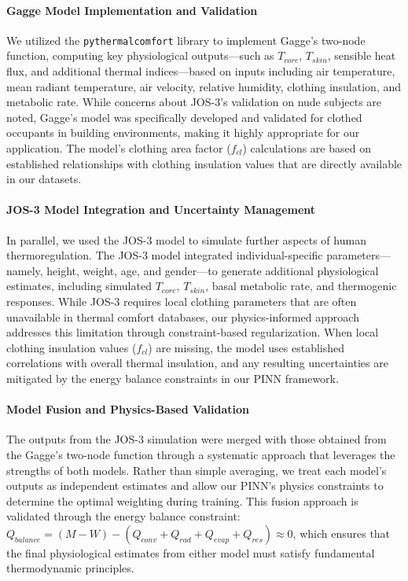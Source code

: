 \paragraph{Gagge Model Implementation and Validation} We utilized the \texttt{pythermalcomfort} library to implement Gagge's two-node function, computing key physiological outputs—such as $T_{core}$, $T_{skin}$, sensible heat flux, and additional thermal indices—based on inputs including air temperature, mean radiant temperature, air velocity, relative humidity, clothing insulation, and metabolic rate. While concerns about JOS-3's validation on nude subjects are noted, Gagge's model was specifically developed and validated for clothed occupants in building environments, making it highly appropriate for our application. The model's clothing area factor ($f_{cl}$) calculations are based on established relationships with clothing insulation values that are directly available in our datasets.

\paragraph{JOS-3 Model Integration and Uncertainty Management} In parallel, we used the JOS-3 model to simulate further aspects of human thermoregulation. The JOS-3 model integrated individual-specific parameters—namely, height, weight, age, and gender—to generate additional physiological estimates, including simulated $T_{core}$, $T_{skin}$, basal metabolic rate, and thermogenic responses. While JOS-3 requires local clothing parameters that are often unavailable in thermal comfort databases, our physics-informed approach addresses this limitation through constraint-based regularization. When local clothing insulation values ($f_{cl}$) are missing, the model uses established correlations with overall thermal insulation, and any resulting uncertainties are mitigated by the energy balance constraints in our PINN framework.

\paragraph{Model Fusion and Physics-Based Validation} The outputs from the JOS-3 simulation were merged with those obtained from the Gagge's two-node function through a systematic approach that leverages the strengths of both models. Rather than simple averaging, we treat each model's outputs as independent estimates and allow our PINN's physics constraints to determine the optimal weighting during training. This fusion approach is validated through the energy balance constraint: $Q_{balance} = (M - W) - (Q_{conv} + Q_{rad} + Q_{evap} + Q_{res}) \approx 0$, which ensures that the final physiological estimates from either model must satisfy fundamental thermodynamic principles.

